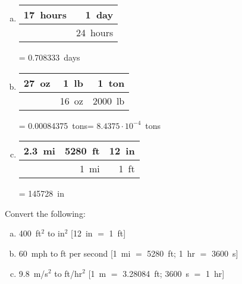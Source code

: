 \documentclass[11pt,letterpaper]{article}
\begin{document}
\sol
\begin{enumerate}[(a)]
\item \phantom{.} \par
	\begin{table}[!ht]
	\centering
	\begin{tabular}{r|r}
	17~hours & 1~day \\ \hline
		        & 24~hours 
	\end{tabular}
	= 0.708333~days
	\end{table}

\item \phantom{.} \par
	\begin{table}[!ht]
	\centering
	\begin{tabular}{r|r|r}
	27~oz & 1~lb & 1~ton \\ \hline
		   & 16~oz & 2000~lb
	\end{tabular}
	= 0.00084375~tons= $8.4375 \cdot 10^{-4}$~tons
	\end{table}

\item  \phantom{.} \par
	\begin{table}[!ht]
	\centering
	\begin{tabular}{r|r|r}
	2.3~mi & 5280~ft & 12~in \\ \hline
		    & 1~mi     & 1~ft
	\end{tabular}
	= 145728~in
	\end{table}
\end{enumerate}



\newpage



 Convert the following:
\begin{enumerate}[(a)]
\item 400~ft$^2$ to in$^2$ [12~in $=$ 1~ft]
\item 60~mph to ft per second [1~mi $=$ 5280~ft; 1~hr $=$ 3600~s]
\item 9.8~m/s$^2$ to ft/hr$^2$ [1~m $=$ 3.28084~ft; 3600~s $=$ 1~hr]
\end{enumerate} \pspace
\end{document}
